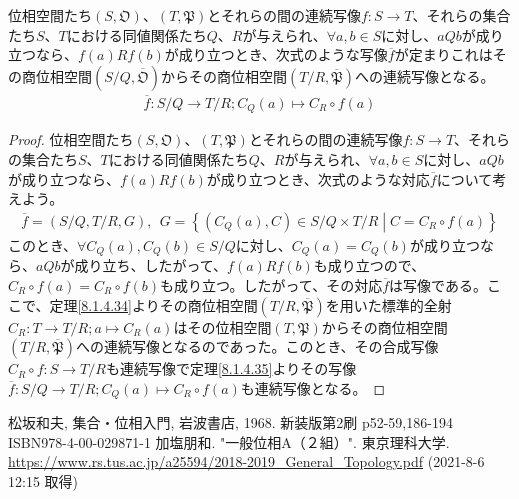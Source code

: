 \documentclass[dvipdfmx]{jsarticle}
\begin{document}
\begin{thm}\label{8.1.4.36}
位相空間たち$\left( S,\mathfrak{O} \right)$、$\left( T,\mathfrak{P} \right)$とそれらの間の連続写像$f:S \rightarrow T$、それらの集合たち$S$、$T$における同値関係たち$Q$、$R$が与えられ、$\forall a,b \in S$に対し、$aQb$が成り立つなら、$f(a)Rf(b)$が成り立つとき、次式のような写像$\overline{f}$が定まりこれはその商位相空間$\left( {S}/{Q},\overline{\mathfrak{O}} \right)$からその商位相空間$\left( {T}/{R},\overline{\mathfrak{P}} \right)$への連続写像となる。
\begin{align*}
\overline{f}:{S}/{Q} \rightarrow {T}/{R};C_{Q}(a) \mapsto C_{R} \circ f(a)
\end{align*}
\end{thm}
\begin{proof}
位相空間たち$\left( S,\mathfrak{O} \right)$、$\left( T,\mathfrak{P} \right)$とそれらの間の連続写像$f:S \rightarrow T$、それらの集合たち$S$、$T$における同値関係たち$Q$、$R$が与えられ、$\forall a,b \in S$に対し、$aQb$が成り立つなら、$f(a)Rf(b)$が成り立つとき、次式のような対応$\overline{f}$について考えよう。
\begin{align*}
\overline{f} = \left( {S}/{Q},{T}/{R},G \right),\ \ G = \left\{ \left( C_{Q}(a),C \right) \in {S}/{Q} \times {T}/{R} \middle| C = C_{R} \circ f(a) \right\}
\end{align*}
このとき、$\forall C_{Q}(a),C_{Q}(b) \in {S}/{Q}$に対し、$C_{Q}(a) = C_{Q}(b)$が成り立つなら、$aQb$が成り立ち、したがって、$f(a)Rf(b)$も成り立つので、$C_{R} \circ f(a) = C_{R} \circ f(b)$も成り立つ。したがって、その対応$\overline{f}$は写像である。ここで、定理\ref{8.1.4.34}よりその商位相空間$\left( {T}/{R},\overline{\mathfrak{P}} \right)$を用いた標準的全射$C_{R}:T \rightarrow {T}/{R};a \mapsto C_{R}(a)$はその位相空間$\left( T,\mathfrak{P} \right)$からその商位相空間$\left( {T}/{R},\overline{\mathfrak{P}} \right)$への連続写像となるのであった。このとき、その合成写像$C_{R} \circ f:S \rightarrow {T}/{R}$も連続写像で定理\ref{8.1.4.35}よりその写像$\overline{f}:{S}/{Q} \rightarrow {T}/{R};C_{Q}(a) \mapsto C_{R} \circ f(a)$も連続写像となる。
\end{proof}
\begin{thebibliography}{50}
  松坂和夫, 集合・位相入門, 岩波書店, 1968. 新装版第2刷 p52-59,186-194 ISBN978-4-00-029871-1
  加塩朋和. "一般位相A（２組）". 東京理科大学. \url{https://www.rs.tus.ac.jp/a25594/2018-2019_General_Topology.pdf} (2021-8-6 12:15 取得)
\end{thebibliography}
\end{document}
